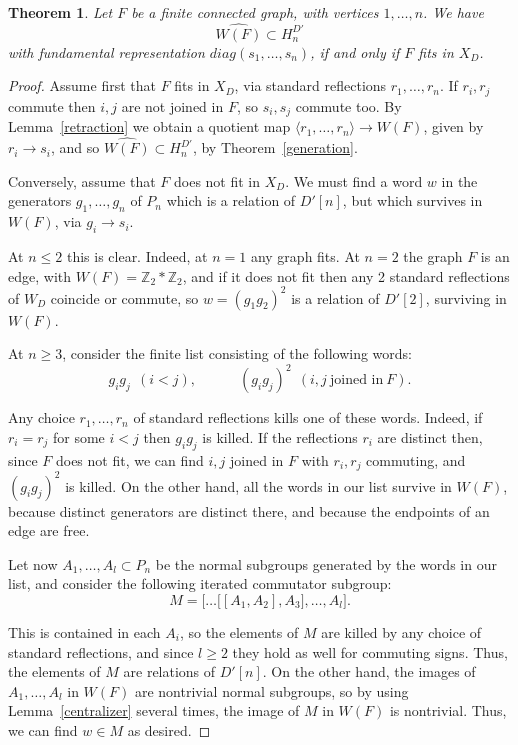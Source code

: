 \documentclass[11pt,a4paper]{article}
\newtheorem{thm}{Theorem}[section]
\begin{document}
\begin{thm}\label{test}
Let $F$ be a finite connected graph, with vertices $1,\ldots,n$. We have
\[
 \widehat{W(F)}\subset H_n^{D'}
\]
with fundamental representation $diag(s_1,\ldots,s_n)$, if and only if $F$ fits in $X_D$.
\end{thm}

\begin{proof}
Assume first that $F$ fits in $X_D$, via standard reflections $r_1,\ldots,r_n$. If $r_i,r_j$ commute then $i,j$ are not joined in $F$, so $s_i,s_j$ commute too. By Lemma~\ref{retraction} we obtain a quotient map $\langle r_1,\ldots,r_n\rangle\to W(F)$, given by $r_i\to s_i$, and so $\widehat{W(F)}\subset H_n^{D'}$, by Theorem~\ref{generation}.

Conversely, assume that $F$ does not fit in $X_D$. We must find a word $w$ in the generators $g_1,\ldots,g_n$ of $P_n$ which is a relation of $D'[n]$, but which survives in $W(F)$, via $g_i\to s_i$.

At $n\leq2$ this is clear. Indeed, at $n=1$ any graph fits. At $n=2$ the graph $F$ is an edge, with $W(F)=\mathbb Z_2*\mathbb Z_2$, and if it does not fit then any 2 standard reflections of $W_D$ coincide or commute, so $w=(g_1g_2)^2$ is a relation of $D'[2]$, surviving in $W(F)$.

At $n\geq3$, consider the finite list consisting of the following words:
\[
 g_ig_j\ \ (i<j),\qquad\quad(g_ig_j)^2\ \ (i,j\ \text{joined in}\ F).
\]

Any choice $r_1,\ldots,r_n$ of standard reflections kills one of these words. Indeed, if $r_i=r_j$ for some $i<j$ then $g_ig_j$ is killed. If the reflections $r_i$ are distinct then, since $F$ does not fit, we can find $i,j$ joined in $F$ with $r_i,r_j$ commuting, and $(g_ig_j)^2$ is killed. On the other hand, all the words in our list survive in $W(F)$, because distinct generators are distinct there, and because the endpoints of an edge are free.

Let now $A_1,\ldots,A_l\subset P_n$ be the normal subgroups generated by the words in our list, and consider the following iterated commutator subgroup:
\[
 M=\big[\ldots\big[[A_1,A_2],A_3\big],\ldots,A_l\big].
\]

This is contained in each $A_i$, so the elements of $M$ are killed by any choice of standard reflections, and since $l\geq2$ they hold as well for commuting signs. Thus, the elements of $M$ are relations of $D'[n]$. On the other hand, the images of $A_1,\ldots,A_l$ in $W(F)$ are nontrivial normal subgroups, so by using Lemma~\ref{centralizer} several times, the image of $M$ in $W(F)$ is nontrivial. Thus, we can find $w\in M$ as desired.
\end{proof}
\end{document}
